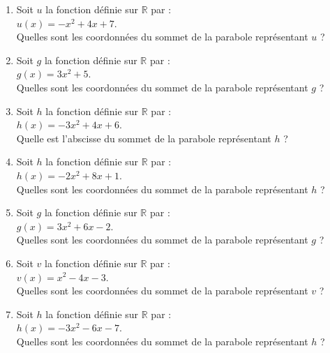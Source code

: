 \begin{enumerate}[itemsep=1em]
	\item Soit $u$ la fonction définie sur $\mathbb{R}$ par :\\          $u(x)=-x^2+4x+7$. \\          Quelles sont les coordonnées du sommet de la parabole représentant $u$ ?
	\item Soit $g$ la fonction définie sur $\mathbb{R}$ par :\\          $g(x)=3x^2+5$. \\          Quelles sont les coordonnées du sommet de la parabole représentant $g$ ?
	\item Soit $h$ la fonction définie sur $\mathbb{R}$ par :\\      $h(x)=-3x^2+4x+6$. \\
      Quelle est l'abscisse du sommet de la parabole représentant $h$ ?
	\item Soit $h$ la fonction définie sur $\mathbb{R}$ par :\\          $h(x)=-2x^2+8x+1$. \\          Quelles sont les coordonnées du sommet de la parabole représentant $h$ ?
	\item Soit $g$ la fonction définie sur $\mathbb{R}$ par :\\          $g(x)=3x^2+6x-2$. \\          Quelles sont les coordonnées du sommet de la parabole représentant $g$ ?
	\item Soit $v$ la fonction définie sur $\mathbb{R}$ par :\\          $v(x)=x^2-4x-3$. \\          Quelles sont les coordonnées du sommet de la parabole représentant $v$ ?
	\item Soit $h$ la fonction définie sur $\mathbb{R}$ par :\\          $h(x)=-3x^2-6x-7$. \\          Quelles sont les coordonnées du sommet de la parabole représentant $h$ ?
\end{enumerate}

